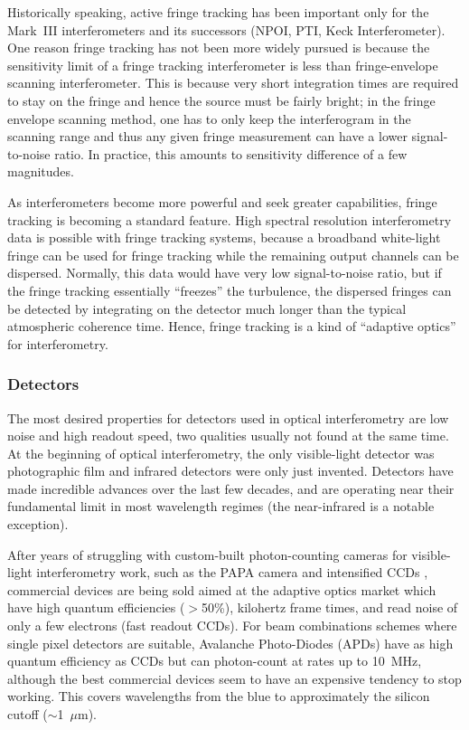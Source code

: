 \documentclass[12pt]{article}
\begin{document}
Historically speaking, active fringe tracking has been important only
for the Mark~III interferometers and its successors (NPOI, PTI, 
Keck Interferometer). One reason fringe tracking has not been more widely
pursued is because the sensitivity limit of a fringe
tracking interferometer is less than fringe-envelope scanning interferometer.
This is because very short integration times are required to stay on the
fringe and hence the source must be fairly bright; in the fringe envelope
scanning method, one has to only keep the interferogram in the scanning range and
thus any given fringe measurement can have a lower signal-to-noise ratio.
In practice, this amounts to sensitivity difference of a 
few magnitudes.

As interferometers become more powerful and seek greater capabilities,
fringe tracking is becoming a standard feature.  High spectral
resolution interferometry data is possible with fringe tracking
systems, because a broadband white-light fringe can be used for fringe
tracking while the remaining output channels can be dispersed.
Normally, this data would have very low signal-to-noise ratio, but if
the fringe tracking essentially ``freezes'' the turbulence, the
dispersed fringes can be detected by integrating on the detector much
longer than the typical atmospheric coherence time.  Hence, fringe
tracking is a kind of ``adaptive optics'' for interferometry.

\subsubsection{Detectors}
\label{detectors}
The most desired properties for detectors used in optical interferometry
are low noise and high readout speed, two qualities usually not found
at the same time.  At the beginning of optical interferometry, the
only visible-light detector was photographic film and infrared detectors
were only just invented.  Detectors have made incredible advances over
the last few decades, and are operating near their fundamental limit
in most wavelength regimes (the near-infrared is a notable exception).

After years of struggling with custom-built photon-counting cameras
for visible-light interferometry work, such as the PAPA camera
\citep{papa1985,lawson1994} and intensified CCDs
\citep[e.g.,][]{blazit1987,foy1988}, commercial devices are being sold
aimed at the adaptive optics market which have high quantum
efficiencies ($>$50\%), kilohertz frame times, and read noise of only
a few electrons (fast readout CCDs).  For beam combinations schemes
where single pixel detectors are suitable, Avalanche Photo-Diodes
(APDs) have as high quantum efficiency as CCDs but can photon-count at
rates up to 10~MHz, although the best commercial devices seem to have
an expensive tendency to stop working.  This covers wavelengths from
the blue to approximately the silicon cutoff ($\sim$1~$\mu$m).
\end{document}
